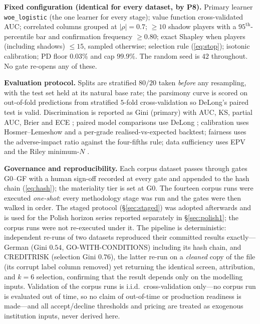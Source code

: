 \documentclass[9pt,journal]{IEEEtai}
\begin{document}
\textbf{Fixed configuration (identical for every dataset, by P8).} Primary learner
\texttt{woe\_logistic} (the one learner for every stage); value function cross-validated AUC;
correlated columns grouped at $|\rho|=0.7$; $\ge10$ shadow players with a $95^{\text{th}}$-percentile
bar and confirmation frequency $\ge0.80$; exact Shapley when players (including shadows)
$\le15$, sampled otherwise; selection rule (\ref{eq:stop}); isotonic calibration; PD floor
$0.03\%$ and cap $99.9\%$. The random seed is $42$ throughout. No gate re-opens any of these.

\textbf{Evaluation protocol.} Splits are stratified $80/20$ taken \emph{before} any resampling,
with the test set held at its natural base rate; the parsimony curve is scored on out-of-fold
predictions from stratified $5$-fold cross-validation so DeLong's paired test is valid.
Discrimination is reported as Gini (primary) with AUC, KS, partial AUC, Brier and ECE \cite{naeini2015}; paired
model comparisons use DeLong \cite{delong1988}; calibration uses Hosmer--Lemeshow \cite{hl1980}
and a per-grade realised-vs-expected backtest; fairness uses the adverse-impact ratio against
the four-fifths rule; data sufficiency uses EPV \cite{peduzzi1996} and the Riley minimum-$N$
\cite{riley2020bmj}.

\textbf{Governance and reproducibility.} Each corpus dataset passes through gates G0--GF with
a human sign-off recorded at every gate and appended to the hash chain (\ref{eq:hash}); the
materiality tier is set at G0. The fourteen corpus runs were executed \emph{one-shot}: every
methodology stage was run and the gates were then walked in order. The staged protocol
(\S\ref{sec:staged}) was adopted afterwards and is used for the Polish horizon series reported separately
in \S\ref{sec:polish1}; the corpus runs were not re-executed under it. The pipeline is deterministic: independent re-runs of two datasets
reproduced their committed results exactly---German (Gini $0.54$, GO-WITH-CONDITIONS) including its
hash chain, and CREDITRISK (selection Gini $0.76$), the latter re-run on a \emph{cleaned} copy of the
file (its corrupt label column removed) yet returning the identical screen, attribution, and
$k{=}6$ selection, confirming that the result depends only on the modelling inputs.
Validation of the corpus runs is i.i.d.\ cross-validation only---no corpus run is evaluated out of time,
so no claim of out-of-time or production readiness is made---and all accept/decline thresholds and pricing are
treated as exogenous institution inputs, never derived here.
\end{document}
